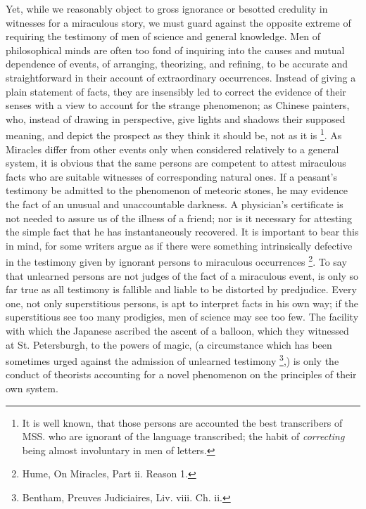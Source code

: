 Yet, while we reasonably object to gross
ignorance or besotted credulity in witnesses for a miraculous story,
we must guard against the opposite extreme of requiring the testimony
of men of science and general knowledge. Men of philosophical minds
are often too fond of inquiring into the causes and mutual
dependence
of events, of arranging, theorizing, and refining, to be accurate and
straightforward in their account of extraordinary occurrences. Instead
of giving a plain statement of facts, they are insensibly led to
correct the evidence of their senses with a view to account for the
strange phenomenon; as Chinese painters, who, instead of drawing in
perspective, give lights and shadows their supposed meaning, and
depict the prospect as they think it should be, not as it is \footnote{It is well known, that those persons are accounted the best
transcribers of MSS. who are ignorant of the language transcribed; the
habit of \emph{correcting} being almost involuntary in men of letters.}. As Miracles differ from other events only when considered
relatively to a general system, it is obvious that the same persons
are competent to attest miraculous facts who are suitable witnesses of
corresponding natural ones. If a peasant's testimony be admitted to
the phenomenon of meteoric stones, he may evidence the fact of an
unusual and unaccountable darkness. A physician's certificate is not
needed to assure us of the illness of a friend; nor is it necessary
for attesting the simple fact that he has instantaneously recovered.
It is important to bear this in mind, for some writers argue as if
there were something intrinsically defective in the testimony given by
ignorant persons to miraculous occurrences \footnote{Hume, On Miracles, Part ii. Reason 1.}. To say that unlearned persons are not judges of the fact
of a miraculous event, is only so far true as all testimony is
fallible and liable to be distorted by predjudice. Every one, not only
superstitious persons, is apt to interpret facts in his own way; if
the superstitious see too many prodigies, men of science may see too
few. The facility with which the Japanese ascribed the ascent of a
balloon, which they witnessed at St. Petersburgh, to the powers of
magic, (a circumstance which has been sometimes urged against the
admission of unlearned testimony \footnote{Bentham, Preuves Judiciaires, Liv. viii. Ch. ii.},) is only the conduct of theorists accounting for a novel
phenomenon on the principles of their own system.

